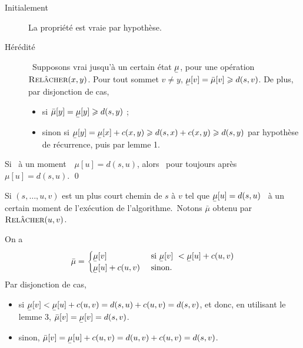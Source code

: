 {{		\begin{prv}
			\begin{description}
				\item[Initialement] La propriété est vraie par hypothèse.
				\item[Hérédité] Supposons vrai jusqu'à un certain état $\ubar\mu$, pour une opération $\textsc{Relâcher}(x,y)$.
					Pour tout sommet $v \neq y$, $\ubar\mu[v] = \bar\mu[v] \ge d(s,v)$.
					De plus, par disjonction de cas,
					\begin{itemize}
						\item si $\bar\mu[y] = \ubar\mu[y] \ge d(s,y)$ ;
						\item sinon si $\ubar\mu[y] = \ubar\mu[x] + c(x,y) \ge d(s,x) + c(x,y) \ge d(s,y)$ par hypothèse de récurrence, puis par lemme 1.
					\end{itemize}
			\end{description}
		\end{prv}
	
		\begin{crlr}
			Si \guillemotleft~à un moment~\guillemotright\ $\mu[u] = d(s,u)$, alors \guillemotleft~pour toujours après~\guillemotright\ $\mu[u] = d(s,u)$.
			\qed
		\end{crlr}
	
		\begin{numlem}
			Si $(s, \ldots, u, v)$ est un plus court chemin de $s$ à $v$ tel que $\ubar\mu[u] = d(s,u)$ \guillemotleft~à un certain moment de l'exécution de l'algorithme.~\guillemotright\@ Notons $\bar\mu$ obtenu par $\textsc{Relâcher}(u,v)$.
		\end{numlem}
	
		\begin{prv}
			On a \[
				\bar\mu = \begin{cases}
					\ubar\mu[v] & \text{ si } \ubar\mu[v] < \ubar\mu[u] + c(u,v)\\
					\ubar\mu[u] + c(u,v) &\text{ sinon}.
				\end{cases}
			\]Par disjonction de cas,
			\begin{itemize}
				\item si $\ubar\mu[v] < \ubar\mu[u] + c(u,v) = d(s, u) + c(u,v) = d(s,v)$, et donc, en utilisant le lemme 3, $\bar\mu[v] = \ubar\mu[v] = d(s,v)$.
				\item sinon, $\bar\mu[v] = \ubar\mu[u] + c(u,v) = d(u,v) + c(u, v) = d(s,v)$.
			\end{itemize}
		\end{prv}
	
}}
